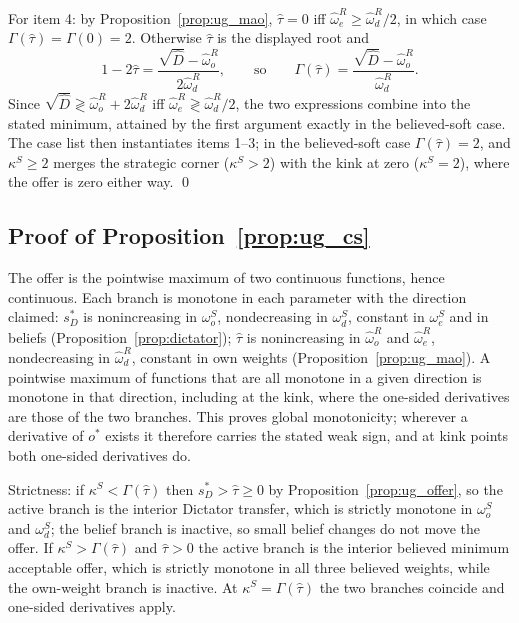\documentclass[11pt]{article}
\theoremstyle{plain}
\theoremstyle{remark}
\begin{document}
For item 4: by Proposition~\ref{prop:ug_mao}, $\hat\tau=0$ iff $\hat\omega_e^{R}\ge\hat\omega_d^{R}/2$, in which case $\Gamma(\hat\tau)=\Gamma(0)=2$.  Otherwise $\hat\tau$ is the displayed root and
\[
        1-2\hat\tau=\frac{\sqrt{\hat D}-\hat\omega_o^{R}}{2\hat\omega_d^{R}},
        \qquad\text{so}\qquad
        \Gamma(\hat\tau)=\frac{\sqrt{\hat D}-\hat\omega_o^{R}}{\hat\omega_d^{R}}.
\]
Since $\sqrt{\hat D}\gtrless\hat\omega_o^{R}+2\hat\omega_d^{R}$ iff $\hat\omega_e^{R}\gtrless\hat\omega_d^{R}/2$, the two expressions combine into the stated minimum, attained by the first argument exactly in the believed-soft case.  The case list then instantiates items 1--3; in the believed-soft case $\Gamma(\hat\tau)=2$, and $\kappa^S\ge2$ merges the strategic corner ($\kappa^S>2$) with the kink at zero ($\kappa^S=2$), where the offer is zero either way.
\qed

\subsection*{Proof of Proposition~\ref{prop:ug_cs}}

The offer is the pointwise maximum of two continuous functions, hence continuous.  Each branch is monotone in each parameter with the direction claimed: $s_D^\ast$ is nonincreasing in $\omega_o^S$, nondecreasing in $\omega_d^S$, constant in $\omega_e^S$ and in beliefs (Proposition~\ref{prop:dictator}); $\hat\tau$ is nonincreasing in $\hat\omega_o^{R}$ and $\hat\omega_e^{R}$, nondecreasing in $\hat\omega_d^{R}$, constant in own weights (Proposition~\ref{prop:ug_mao}).  A pointwise maximum of functions that are all monotone in a given direction is monotone in that direction, including at the kink, where the one-sided derivatives are those of the two branches.  This proves global monotonicity; wherever a derivative of $o^\ast$ exists it therefore carries the stated weak sign, and at kink points both one-sided derivatives do.

Strictness: if $\kappa^S<\Gamma(\hat\tau)$ then $s_D^\ast>\hat\tau\ge0$ by Proposition~\ref{prop:ug_offer}, so the active branch is the interior Dictator transfer, which is strictly monotone in $\omega_o^S$ and $\omega_d^S$; the belief branch is inactive, so small belief changes do not move the offer.  If $\kappa^S>\Gamma(\hat\tau)$ and $\hat\tau>0$ the active branch is the interior believed minimum acceptable offer, which is strictly monotone in all three believed weights, while the own-weight branch is inactive.  At $\kappa^S=\Gamma(\hat\tau)$ the two branches coincide and one-sided derivatives apply.
\end{document}
